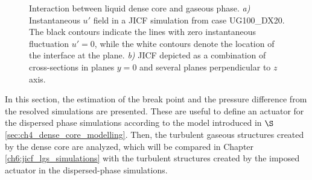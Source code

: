 
\begin{figure}[ht]
\flushleft
{}
\caption[Interaction between liquid dense core and gaseous phase.]{Interaction between liquid dense core and gaseous phase. \textsl{a)} Instantaneous $u'$ field in a JICF simulation from case UG100\_DX20. The black contours indicate the lines with zero instantaneous fluctuation $u' = 0$, while the white contours denote the location of the interface at the plane. \textsl{b)} JICF depicted as a combination of cross-sections in planes $y = 0$ and several planes perpendicular to $z$ axis.}
\label{fig:jet_air_interaction_up_and_skeleton}
\end{figure}

In this section, the estimation of the break point and the pressure difference from the resolved simulations are presented. These are useful to define an actuator for the dispersed phase simulations according to the model introduced in $\S$\ref{sec:ch4_dense_core_modelling}. Then, the turbulent gaseous structures created by the dense core are analyzed, which will be compared in Chapter \ref{ch6:jicf_lgs_simulations} with the turbulent structures created by the imposed actuator in the dispersed-phase simulations.


